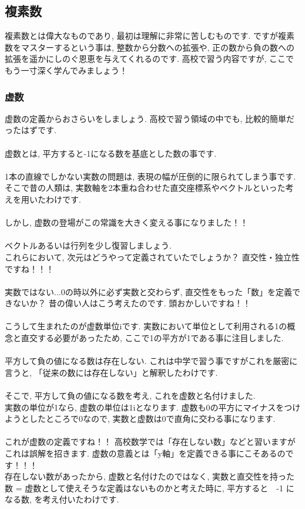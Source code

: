 \documentclass[11pt,a4paper]{jsarticle}
\begin{document}
\subsection{複素数}
複素数とは偉大なものであり, 最初は理解に非常に苦しむものです. ですが複素数をマスターするという事は, 整数から分数への拡張や, 正の数から負の数への拡張を遥かにしのぐ恩恵を与えてくれるのです. 高校で習う内容ですが, ここでもう一寸深く学んでみましょう！\\
\subsubsection{虚数}
虚数の定義からおさらいをしましょう. 高校で習う領域の中でも, 比較的簡単だったはずです.\\
\\
虚数とは, 平方すると-1になる数を基底とした数の事です.\\
\\
1本の直線でしかない実数の問題は, 表現の幅が圧倒的に限られてしまう事です. そこで昔の人類は, 実数軸を2本重ね合わせた直交座標系やベクトルといった考えを用いたわけです.\\
\\
しかし, 虚数の登場がこの常識を大きく変える事になりました！！\\
\\
ベクトルあるいは行列を少し復習しましょう.\\
これらにおいて, 次元はどうやって定義されていたでしょうか？ 直交性・独立性ですね！！！\\
\\
実数ではない...0の時以外に必ず実数と交わらず, 直交性をもった「数」を定義できないか？
昔の偉い人はこう考えたのです. 頭おかしいですね！！\\
\\
こうして生まれたのが虚数単位iです. 実数において単位として利用される1の概念と直交する必要があったため, ここで1の平方が1である事に注目しました. \\
\\
平方して負の値になる数は存在しない. これは中学で習う事ですがこれを厳密に言うと, 「従来の数には存在しない」と解釈したわけです.\\
\\
そこで, 平方して負の値になる数を考え, これを虚数と名付けました.\\
実数の単位が1なら, 虚数の単位は1iとなります. 虚数も0の平方にマイナスをつけようとしたところで0なので, 実数と虚数は0で直角に交わる事になります.\\
\\
これが虚数の定義ですね！！ 高校数学では「存在しない数」などと習いますがこれは誤解を招きます. 虚数の意義とは「y軸」を定義できる事にこそあるのです！！！\\
存在しない数があったから, 虚数と名付けたのではなく, 実数と直交性を持った数 = 虚数として使えそうな定義はないものかと考えた時に, 平方すると　-1 になる数, を考え付いたわけです.
\end{document}
